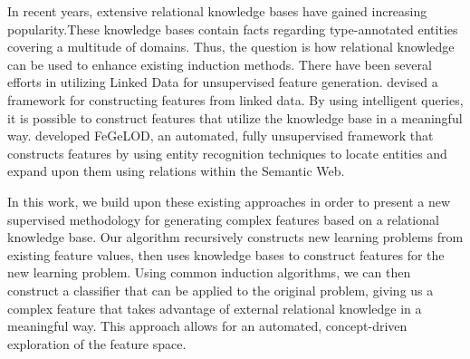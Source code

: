 \documentclass{article}
\theoremstyle{definition}
\begin{document}
In recent years, extensive relational knowledge bases have gained increasing popularity.These knowledge bases contain facts regarding type-annotated entities covering a multitude of domains. %
 Thus, the question is how relational knowledge can be used to enhance existing induction methods.
There have been several efforts in utilizing Linked Data for unsupervised feature generation. \cite{cheng2011automatedfull} devised a framework for constructing features from linked data. By using intelligent queries, it is possible to construct features that utilize the knowledge base in a meaningful way. 
\cite{paulheim2012unsupervisedfull} developed FeGeLOD, an automated, fully unsupervised framework that constructs features by using entity recognition techniques to locate entities and expand upon them using relations within the Semantic Web. %

In this work, we build upon these existing approaches in order to present a new supervised methodology for generating complex features based on a relational knowledge base. Our algorithm recursively constructs new learning problems from existing feature values, then uses knowledge bases to construct features for the new learning problem. %
Using common induction algorithms, we can then construct a classifier that can be applied to the original problem, giving us a complex feature that takes advantage of external relational knowledge in a meaningful way.
This approach allows for an automated, concept-driven exploration of the feature space.
\end{document}
